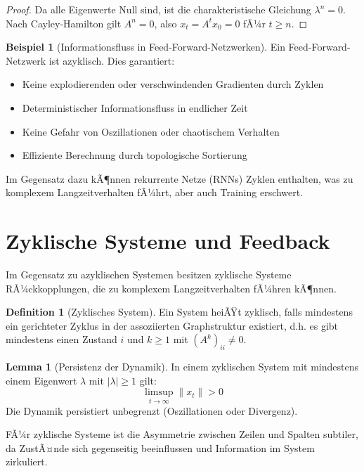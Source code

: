 ﻿\documentclass[a4paper,12pt]{report}
\theoremstyle{definition}
\newtheorem{definition}{Definition}
\newtheorem{beispiel}{Beispiel}
\newtheorem{lemma}{Lemma}
\begin{document}
	\begin{proof}
		Da alle Eigenwerte Null sind, ist die charakteristische Gleichung $\lambda^n = 0$. Nach Cayley-Hamilton gilt $A^n = 0$, also $x_t = A^t x_0 = 0$ fÃ¼r $t \geq n$.
	\end{proof}
	
	\begin{beispiel}[Informationsfluss in Feed-Forward-Netzwerken]
		Ein Feed-Forward-Netzwerk ist azyklisch. Dies garantiert:
		\begin{itemize}
			\item Keine explodierenden oder verschwindenden Gradienten durch Zyklen
			\item Deterministischer Informationsfluss in endlicher Zeit
			\item Keine Gefahr von Oszillationen oder chaotischem Verhalten
			\item Effiziente Berechnung durch topologische Sortierung
		\end{itemize}
		
		Im Gegensatz dazu kÃ¶nnen rekurrente Netze (RNNs) Zyklen enthalten, was zu komplexem Langzeitverhalten fÃ¼hrt, aber auch Training erschwert.
	\end{beispiel}
	
	\section{Zyklische Systeme und Feedback}
	
	Im Gegensatz zu azyklischen Systemen besitzen zyklische Systeme RÃ¼ckkopplungen, die zu komplexem Langzeitverhalten fÃ¼hren kÃ¶nnen.
	
	\begin{definition}[Zyklisches System]
		Ein System heiÃŸt zyklisch, falls mindestens ein gerichteter Zyklus in der assoziierten Graphstruktur existiert, d.h. es gibt mindestens einen Zustand $i$ und $k \geq 1$ mit $(A^k)_{ii} \neq 0$.
	\end{definition}
	
	\begin{lemma}[Persistenz der Dynamik]
		In einem zyklischen System mit mindestens einem Eigenwert $\lambda$ mit $|\lambda| \geq 1$ gilt:
		\[
		\limsup_{t \to \infty} \|x_t\| > 0
		\]
		Die Dynamik persistiert unbegrenzt (Oszillationen oder Divergenz).
	\end{lemma}
	
	FÃ¼r zyklische Systeme ist die Asymmetrie zwischen Zeilen und Spalten subtiler, da ZustÃ¤nde sich gegenseitig beeinflussen und Information im System zirkuliert.
	
\end{document}
